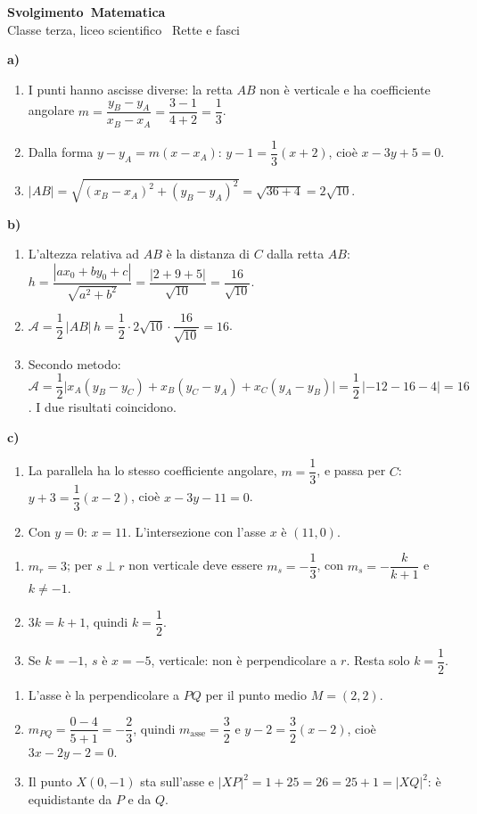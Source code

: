 \documentclass[10pt,a4paper]{article}
\newcommand{\materia}{}
\newcommand{\classe}{}
\newcommand{\esercizio}[1]{\needspace{10\baselineskip}\par\vspace{1em}{\large\bfseries Esercizio #1}\par}
\newcommand{\punto}[1]{\needspace{5\baselineskip}\par\medskip\textbf{#1}\par}
\renewcommand{\materia}{Matematica}
\renewcommand{\classe}{Classe terza, liceo scientifico \textperiodcentered\ Rette e fasci}
\begin{document}
\begin{center}
{\LARGE\bfseries Svolgimento\ \materia}\\[3pt]
\classe
\end{center}

\esercizio{1}
\punto{a)}
\begin{enumerate}
\item I punti hanno ascisse diverse: la retta $AB$ non è verticale e ha coefficiente angolare $m=\dfrac{y_B-y_A}{x_B-x_A}=\dfrac{3-1}{4+2}=\dfrac13$.
\item Dalla forma $y-y_A=m(x-x_A)$: $y-1=\dfrac13(x+2)$, cioè $x-3y+5=0$.
\item $|AB|=\sqrt{(x_B-x_A)^2+(y_B-y_A)^2}=\sqrt{36+4}=2\sqrt{10}$.
\end{enumerate}
\punto{b)}
\begin{enumerate}
\item L'altezza relativa ad $AB$ è la distanza di $C$ dalla retta $AB$: $h=\dfrac{|ax_0+by_0+c|}{\sqrt{a^2+b^2}}=\dfrac{|2+9+5|}{\sqrt{10}}=\dfrac{16}{\sqrt{10}}$.
\item $\mathcal{A}=\dfrac12\,|AB|\,h=\dfrac12\cdot2\sqrt{10}\cdot\dfrac{16}{\sqrt{10}}=16$.
\item Secondo metodo: $\mathcal{A}=\dfrac12\bigl|x_A(y_B-y_C)+x_B(y_C-y_A)+x_C(y_A-y_B)\bigr|=\dfrac12\,|-12-16-4|=16$. I due risultati coincidono.
\end{enumerate}
\punto{c)}
\begin{enumerate}
\item La parallela ha lo stesso coefficiente angolare, $m=\dfrac13$, e passa per $C$: $y+3=\dfrac13(x-2)$, cioè $x-3y-11=0$.
\item Con $y=0$: $x=11$. L'intersezione con l'asse $x$ è $(11,0)$.
\end{enumerate}

\esercizio{2}
\begin{enumerate}
\item $m_r=3$; per $s\perp r$ non verticale deve essere $m_s=-\dfrac13$, con $m_s=-\dfrac{k}{k+1}$ e $k\neq-1$.
\item $3k=k+1$, quindi $k=\dfrac12$.
\item Se $k=-1$, $s$ è $x=-5$, verticale: non è perpendicolare a $r$. Resta solo $k=\dfrac12$.
\end{enumerate}

\esercizio{3}
\begin{enumerate}
\item L'asse è la perpendicolare a $PQ$ per il punto medio $M=(2,2)$.
\item $m_{PQ}=\dfrac{0-4}{5+1}=-\dfrac23$, quindi $m_{\text{asse}}=\dfrac32$ e $y-2=\dfrac32(x-2)$, cioè $3x-2y-2=0$.
\item Il punto $X(0,-1)$ sta sull'asse e $|XP|^2=1+25=26=25+1=|XQ|^2$: è equidistante da $P$ e da $Q$.
\end{enumerate}
\end{document}
